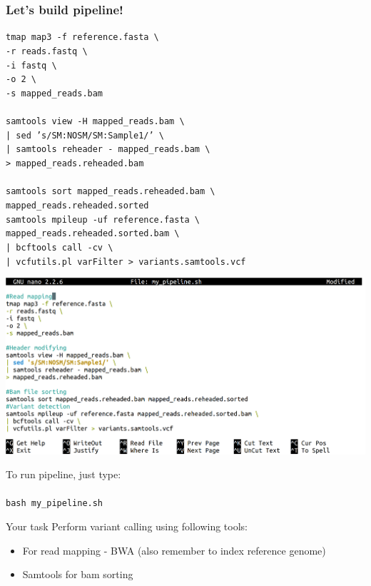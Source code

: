 \documentclass{beamer}
\newcommand{\tmap}[3]{\texttt{tmap map3 -f #1 \textbackslash \\
    -r #2 \textbackslash \\
    -i fastq \textbackslash \\
    -o 2 \textbackslash \\
    -s #3
  }
}
\newcommand{\sortbam}[2]{\texttt{samtools sort #1 \textbackslash \\ #2}}
\newcommand{\reheader}[2]{\texttt{samtools view -H #1 \textbackslash \\
    | sed 's/SM:NOSM/SM:Sample1/' \textbackslash \\
    | samtools reheader - mapped\_reads.bam \textbackslash \\
    > #2
  }
}
\newcommand{\samtoolssnp}[3]{\texttt{samtools mpileup -uf #1 \textbackslash \\
    #2 \textbackslash \\
    | bcftools call -cv \textbackslash \\
    | vcfutils.pl varFilter > #3
  }
}
\begin{document}
\begin{frame}
  \frametitle{Let's build pipeline!}
  \tmap{reference.fasta}{reads.fastq}{mapped\_reads.bam}\\~\\
  \reheader{mapped\_reads.bam}{mapped\_reads.reheaded.bam}\\~\\
  
  \sortbam{mapped\_reads.reheaded.bam}{mapped\_reads.reheaded.sorted}\\
  \samtoolssnp{reference.fasta}{mapped\_reads.reheaded.sorted.bam}{variants.samtools.vcf}
\end{frame}
  
\begin{frame}
  \begin{center}
    \includegraphics[width=\linewidth, keepaspectratio]{pic/mypipeline.png}
  \end{center}
\end{frame}

\begin{frame}
  \Huge To run pipeline, just type:\\~\\
  \texttt{bash my\_pipeline.sh}
\end{frame}

\begin{frame}{Your task}
Perform variant calling using following tools:
  \begin{itemize}
    \item For read mapping - BWA (also remember to index reference genome)
    \item Samtools for bam sorting
  \end{itemize}
\end{frame}

\end{document}
